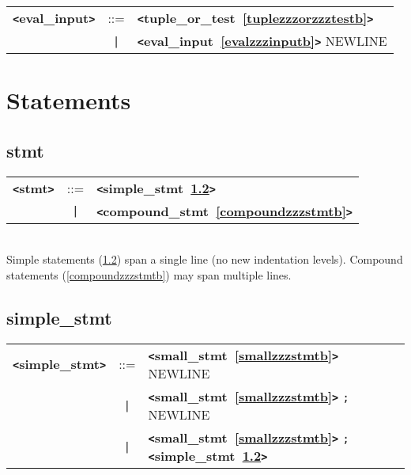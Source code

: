 \documentclass[12pt]{article}
\begin{document}
\begin{tabular}{lcl}
{\bf \verb+<+eval\_input\verb+>+} & ::=  & {\bf \verb+<+tuple\_or\_test~\ref{tuplezzzorzzztestb}\verb+>+}  \\
 & \verb+|+  & {\bf \verb+<+eval\_input~\ref{evalzzzinputb}\verb+>+}  NEWLINE \\
\end{tabular}

\section{Statements}

\subsection{stmt}
\label{stmtb}
\begin{tabular}{lcl}
{\bf \verb+<+stmt\verb+>+} & ::=  & {\bf \verb+<+simple\_stmt~\ref{simplezzzstmtb}\verb+>+}  \\
 & \verb+|+  & {\bf \verb+<+compound\_stmt~\ref{compoundzzzstmtb}\verb+>+}  \\
\end{tabular} \\

Simple statements (\ref{simplezzzstmtb}) span a single line (no new indentation levels).  Compound statements (\ref{compoundzzzstmtb}) may span multiple lines. \\

\subsection{simple\_stmt}
\label{simplezzzstmtb}
\begin{tabular}{lcl}
{\bf \verb+<+simple\_stmt\verb+>+} & ::=  & {\bf \verb+<+small\_stmt~\ref{smallzzzstmtb}\verb+>+}  NEWLINE \\
 & \verb+|+  & {\bf \verb+<+small\_stmt~\ref{smallzzzstmtb}\verb+>+}  \verb|;| NEWLINE \\
 & \verb+|+  & {\bf \verb+<+small\_stmt~\ref{smallzzzstmtb}\verb+>+}  \verb|;| {\bf \verb+<+simple\_stmt~\ref{simplezzzstmtb}\verb+>+}  \\
\end{tabular}
\end{document}
